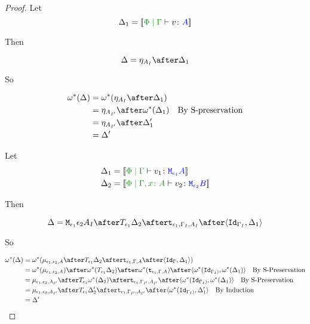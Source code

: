 \documentclass{report}
\begin{document}
\begin{framed}
\begin{proof}
        \case{\vreturn}
        Let \begin{equation}
            \D_1 = \deno{\gpetyperelation{v}{A}}
        \end{equation}
        
        Then
        
        \begin{equation}
            \D = \point{A_I}\after \D_1\\
        \end{equation}
        
        So
        
        \begin{align*}
            \w\star(\D) &= \w\star(\point{A_I}\after \D_1)\\
                    & = \point{A_{I'}} \after\w\star(\D_1)\qt{By S-preservation}\\
                    & = \point{A_{I'}} \after\D_1'\\
                    & = \D'
        \end{align*}
        
        \case{\vbind}
        Let \begin{align*}
            \D_1 &= \deno{\gpetyperelation{v_1}{\M{\e_1}{A}}}\\
            \D_2 &= \deno{\etyperelation{\P}{\gax}{v_2}{\M{\e_2}{B}}}
        \end{align*}
        
        Then
        
        \begin{equation}
            \D = \M{\e_1}{\e_2}{A_I}\after\T{\e_1}{\D_2}\after\tstrength{\e_1}{\G_I}{A_I}\after\pr{\Id{\G_{I}}}{\D_1}\\
        \end{equation}
        
        So
        
        \begin{align*}
            \w\star(\D) &= \w\star(\bind{\e_1}{\e_2}{A}\after\T{\e_1}{\D_2}\after\tstrength{\e_1}{\G}{A}\after\pr{\Id{\G}}{\D_1})\\
            & = \w\star(\bind{\e_1}{\e_2}{A})\after\w\star(\T{\e_1}{\D_2})\after\w\star(\tstrength{\e_1}{\G}{A})\after\pr{\w\star(\Id{\G_{I})}}{\w\star(\D_1)}\qt{By S-Preservation}\\
            &= \bind{\e_1}{\e_2}{A_{I'}}\after\T{\e_1}{\w\star(\D_2)}\after\tstrength{\e_1}{\G_{I'}}{A_{I'}}\after\pr{\w\star(\Id{\G_{I})}}{\w\star(\D_1)}\qt{By S-Preservation}\\
            &= \bind{\e_1}{\e_2}{A_{I'}}\after\T{\e_1}{\D_2'}\after\tstrength{\e_1}{\G_{I'}}{A_{I'}}\after\pr{\w\star(\Id{\G_{I})}}{\D_1'}\qt{By Induction}\\
            &= \D'\\
        \end{align*}
        

\end{proof}
\end{framed}
\end{document}
